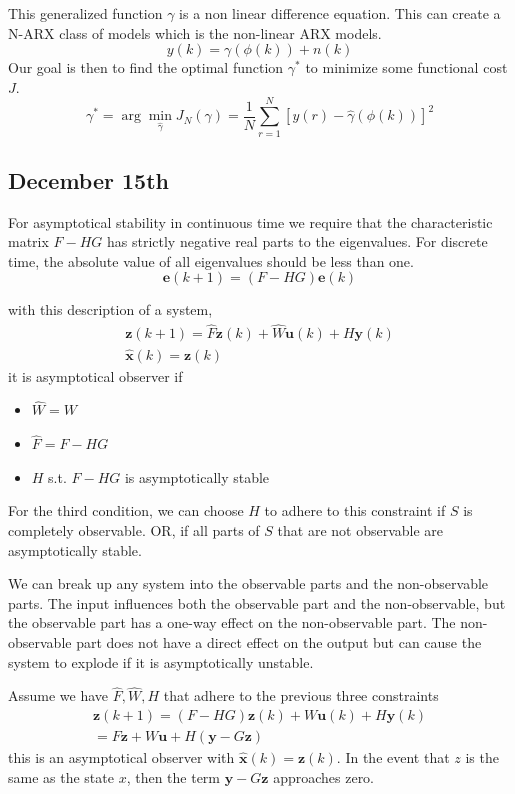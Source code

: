 \documentclass[11pt]{article}
\begin{document}
This generalized function $\gamma$ is a non linear difference equation.
This can create a N-ARX class of models which is the non-linear ARX models.
\begin{equation}
    y(k) = \gamma(\phi(k)) + n(k)
\end{equation}
Our goal is then to find the optimal function $\gamma^*$ to minimize some functional cost $J$.
\begin{equation}
    \gamma^* = \arg \min_{\hat{\gamma}} J_N (\gamma) = \frac{1}{N} \sum_{r=1}^{N} [y(r) - \hat{\gamma}(\phi(k))]^2
\end{equation}

\subsection{December 15th}
For asymptotical stability in continuous time we require that the characteristic matrix $F-HG$ has strictly negative real parts to the eigenvalues.
For discrete time, the absolute value of all eigenvalues should be less than one.
\begin{equation}
    \textbf{e}(k+1) = (F-HG) \textbf{e}(k)
\end{equation}

with this description of a system,
\begin{gather}
    \textbf{z}(k+1) = \hat{F} \textbf{z}(k) + \hat{W} \textbf{u}(k) + H \textbf{y} (k) \\
    \hat{\textbf{x}}(k) = \textbf{z} (k)
\end{gather}
it is asymptotical observer if 
\begin{itemize}
    \item $\hat{W} = W$
    \item $\hat{F} = F - HG$ 
    \item $H$ s.t. $F-HG$ is asymptotically stable
\end{itemize}
For the third condition, we can choose $H$ to adhere to this constraint if $S$ is completely observable.
OR, if all parts of $S$ that are not observable are asymptotically stable.

We can break up any system into the observable parts and the non-observable parts.
The input influences both the observable part and the non-observable, but the observable part has a one-way effect on the non-observable part.
The non-observable part does not have a direct effect on the output but can cause the system to explode if it is asymptotically unstable.

Assume we have $\hat{F}, \hat{W}, H$ that adhere to the previous three constraints
\begin{gather}
    \textbf{z}(k+1) = (F-HG)\textbf{z}(k) + W \textbf{u}(k) + H \textbf{y}(k) \\
    = F \textbf{z} + W \textbf{u} + H(\textbf{y} - G \textbf{z})
\end{gather}
this is an asymptotical observer with $\hat{\textbf{x}}(k) = \textbf{z}(k)$.
In the event that $z$ is the same as the state $x$, then the term $\textbf{y} - G \textbf{z}$ approaches zero.
\end{document}
